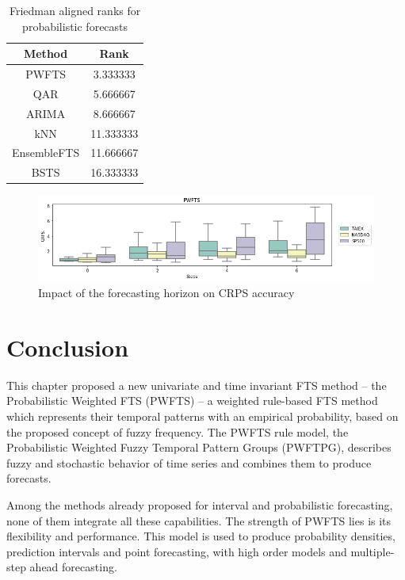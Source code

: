 \begin{table}[hbt]
    \centering
    \begin{tabular}{|c|c|}
\hline
       \textbf{Method} & \textbf{Rank} \\
\hline
PWFTS &   3.333333 \\
QAR &   5.666667 \\
ARIMA &   8.666667 \\
kNN &  11.333333 \\
EnsembleFTS &  11.666667 \\
BSTS &  16.333333 \\ \hline
\end{tabular}
    \caption{Friedman aligned ranks for probabilistic forecasts }
    \label{tab:pwfts_probabilistic_ranks}
\end{table}

\begin{figure}[htb]
    \centering
    \includegraphics[width=\textwidth]{figures/pwfts_ahead_probabilistic.png}
    \caption{Impact of the forecasting horizon on CRPS accuracy}
    \label{fig:pwfts_ahead_probabilistic}
\end{figure}

\section{Conclusion}
\label{sec:pwfts_conclusion}

This chapter proposed a new univariate and time invariant FTS method -- the Probabilistic Weighted FTS (PWFTS) -- a weighted rule-based FTS method which represents their temporal patterns with an empirical probability,  based on the proposed concept of fuzzy frequency. The PWFTS rule model, the Probabilistic Weighted Fuzzy Temporal Pattern Groups (PWFTPG), describes fuzzy and stochastic behavior of time series and combines them to produce forecasts. 

Among the methods already proposed for interval and probabilistic forecasting, none of them integrate all these capabilities. The strength of PWFTS lies is its flexibility and performance. This model is used to produce probability densities, prediction intervals and point forecasting, with high order models and multiple-step ahead forecasting.  

